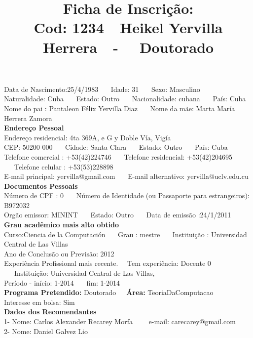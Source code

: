 \documentclass[11pt]{article}
\title{\vspace*{-4cm} Ficha de Inscrição: \\Cod: 1234\ \ Heikel Yervilla Herrera\ \ - \ \ Doutorado 
 }
\date{}
\begin{document}
\maketitle
\vspace*{-1.5cm}
\noindent Data de Nascimento:25/4/1983
\ \ \ Idade: 31   \ \ \ Sexo: Masculino
\\
Naturalidade: Cuba  
\ \ \  Estado: Outro
\ \ \  Nacionalidade: cubana
\ \ \ País: Cuba
\\        
Nome do pai : Pantaleon Félix Yervilla Diaz
\ \ \ Nome da mãe: Marta María Herrera Zamora          
\\[0.2cm]                     
\textbf{Endereço Pessoal} 
\\ 
\noindent Endereço residencial: 4ta 369A, e G y Doble Vía, Vigía
\\
        CEP: 50200-000 
\ \ \ Cidade: Santa Clara 
\ \ \ Estado: Outro 
\ \ \ País: Cuba
\\		
		Telefone comercial : +53(42)224746
\ \ \ Telefone residencial: +53(42)204695
\ \ \ Telefone celular : +53(53)228898
\\
E-mail principal: yervilla@gmail.com
\ \ \ E-mail alternativo: yervilla@uclv.edu.cu 
\\[0.2cm] 
\textbf{Documentos Pessoais}
\\
\noindent Número de CPF : 0
\ \ \ Número de Identidade (ou Passaporte para estrangeiros): B972032
\\
Orgão emissor: MININT
\ \ \ Estado: Outro
\ \ \ Data de emissão :24/1/2011
\\[0.3cm]
\textbf{Grau acadêmico mais alto obtido}
\\	
Curso:Ciencia de la Computación
\ \ \ Grau : mestre
\ \ \ Instituição : Universidad Central de Las Villas
\\			
Ano de Conclusão ou Previsão: 2012
\\ 
Experiência Profissional mais recente. \ \  
Tem experiência: Docente 0  
\ \ \ Instituição: Universidad Central de Las Villas,
\\  
Período - início: 1-2014
\ \ \ fim: 1-2014
\\[0.2cm] 
\textbf{Programa Pretendido:} Doutorado\ \ \ \textbf{Área:} TeoriaDaComputacao\\
Interesse em bolsa: Sim
\\[0.3cm]		
\textbf{Dados dos Recomendantes} 
\\
1- Nome: Carlos Alexander Recarey Morfa
\ \ \ \  e-mail: carecarey@gmail.com 
\\
2- Nome: Daniel Galvez Lio
\end{document}
